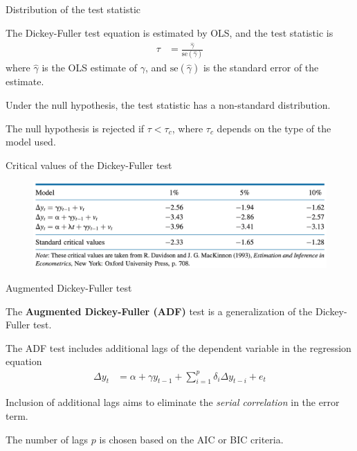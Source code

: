 \documentclass[10pt,aspectratio=169]{beamer}  %
\begin{document}

\begin{frame}{Distribution of the test statistic}

    \bigskip
    The Dickey-Fuller test equation is estimated by OLS, and the test statistic is
    \begin{align*}
        \tau & = \frac{\hat{\gamma}}{\mathrm{se} (\hat{\gamma})}
    \end{align*}
    where $ \hat{\gamma} $ is the OLS estimate of $ \gamma $, and $ \mathrm{se} (\hat{\gamma}) $ is the standard error of the estimate.

    \medskip
    Under the null hypothesis, the test statistic has a non-standard distribution.

    \medskip
    The null hypothesis is rejected if $ \tau < \tau_{c} $, where $ \tau_{c} $ depends on the type of the model used.

\end{frame}


\begin{frame}{Critical values of the Dickey-Fuller test}

    \bigskip
    \begin{figure}[H]
        \centering
        \includegraphics[height=0.25\textwidth]{./fig/dickey-fuller-critical-values.png}
    \end{figure}

\end{frame}


\begin{frame}{Augmented Dickey-Fuller test}

    \bigskip
    The \textbf{Augmented Dickey-Fuller (ADF)} test is a generalization of the Dickey-Fuller test.

    \medskip
    The ADF test includes additional lags of the dependent variable in the regression equation
    \begin{align*}
        \Delta y_{t} & = \alpha + \gamma y_{t-1} + \sum_{i=1}^{p} \delta_{i} \Delta y_{t-i} + e_{t}
    \end{align*}

    Inclusion of additional lags aims to eliminate the \textit{serial correlation} in the error term.

    \medskip
    The number of lags $ p $ is chosen based on the AIC or BIC criteria.

\end{frame}
\end{document}
